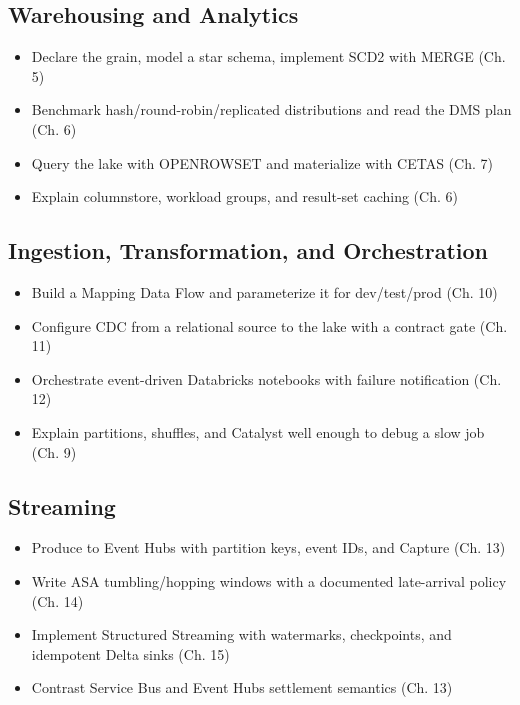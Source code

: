 \subsection*{Warehousing and Analytics}
\begin{itemize}
    \item[$\square$] Declare the grain, model a star schema, implement SCD2 with MERGE (Ch. 5)
    \item[$\square$] Benchmark hash/round-robin/replicated distributions and read the DMS plan (Ch. 6)
    \item[$\square$] Query the lake with OPENROWSET and materialize with CETAS (Ch. 7)
    \item[$\square$] Explain columnstore, workload groups, and result-set caching (Ch. 6)
\end{itemize}

\subsection*{Ingestion, Transformation, and Orchestration}
\begin{itemize}
    \item[$\square$] Build a Mapping Data Flow and parameterize it for dev/test/prod (Ch. 10)
    \item[$\square$] Configure CDC from a relational source to the lake with a contract gate (Ch. 11)
    \item[$\square$] Orchestrate event-driven Databricks notebooks with failure notification (Ch. 12)
    \item[$\square$] Explain partitions, shuffles, and Catalyst well enough to debug a slow job (Ch. 9)
\end{itemize}

\subsection*{Streaming}
\begin{itemize}
    \item[$\square$] Produce to Event Hubs with partition keys, event IDs, and Capture (Ch. 13)
    \item[$\square$] Write ASA tumbling/hopping windows with a documented late-arrival policy (Ch. 14)
    \item[$\square$] Implement Structured Streaming with watermarks, checkpoints, and idempotent Delta sinks (Ch. 15)
    \item[$\square$] Contrast Service Bus and Event Hubs settlement semantics (Ch. 13)
\end{itemize}

